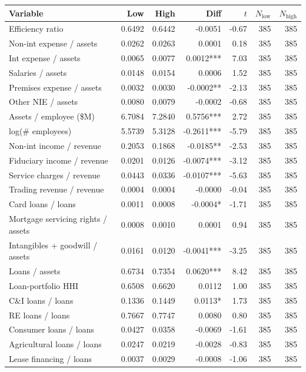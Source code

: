 \begin{tabular}{lrrrrrr}
\toprule
Variable & Low & High & Diff & $t$ & $N_{\text{low}}$ & $N_{\text{high}}$ \\
\midrule
Efficiency ratio & 0.6492 & 0.6442 & -0.0051 & -0.67 & 385 & 385 \\
Non-int expense / assets & 0.0262 & 0.0263 & 0.0001 & 0.18 & 385 & 385 \\
Int expense / assets & 0.0065 & 0.0077 & 0.0012*** & 7.03 & 385 & 385 \\
Salaries / assets & 0.0148 & 0.0154 & 0.0006 & 1.52 & 385 & 385 \\
Premises expense / assets & 0.0032 & 0.0030 & -0.0002** & -2.13 & 385 & 385 \\
Other NIE / assets & 0.0080 & 0.0079 & -0.0002 & -0.68 & 385 & 385 \\
Assets / employee (\$M) & 6.7084 & 7.2840 & 0.5756*** & 2.72 & 385 & 385 \\
log(\# employees) & 5.5739 & 5.3128 & -0.2611*** & -5.79 & 385 & 385 \\
Non-int income / revenue & 0.2053 & 0.1868 & -0.0185** & -2.53 & 385 & 385 \\
Fiduciary income / revenue & 0.0201 & 0.0126 & -0.0074*** & -3.12 & 385 & 385 \\
Service charges / revenue & 0.0443 & 0.0336 & -0.0107*** & -5.63 & 385 & 385 \\
Trading revenue / revenue & 0.0004 & 0.0004 & -0.0000 & -0.04 & 385 & 385 \\
Card loans / loans & 0.0011 & 0.0008 & -0.0004* & -1.71 & 385 & 385 \\
Mortgage servicing rights / assets & 0.0008 & 0.0010 & 0.0001 & 0.94 & 385 & 385 \\
Intangibles + goodwill / assets & 0.0161 & 0.0120 & -0.0041*** & -3.25 & 385 & 385 \\
Loans / assets & 0.6734 & 0.7354 & 0.0620*** & 8.42 & 385 & 385 \\
Loan-portfolio HHI & 0.6508 & 0.6620 & 0.0112 & 1.00 & 385 & 385 \\
C\&I loans / loans & 0.1336 & 0.1449 & 0.0113* & 1.73 & 385 & 385 \\
RE loans / loans & 0.7667 & 0.7747 & 0.0080 & 0.80 & 385 & 385 \\
Consumer loans / loans & 0.0427 & 0.0358 & -0.0069 & -1.61 & 385 & 385 \\
Agricultural loans / loans & 0.0247 & 0.0219 & -0.0028 & -0.83 & 385 & 385 \\
Lease financing / loans & 0.0037 & 0.0029 & -0.0008 & -1.06 & 385 & 385 \\

\end{tabular}
